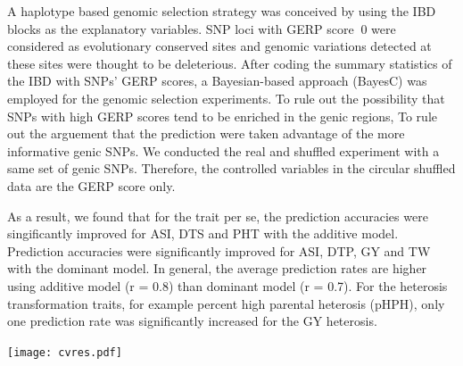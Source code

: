 \documentclass[a0,portrait]{a0poster}
\begin{document}
\begin{multicols}{2}
A haplotype based genomic selection strategy was conceived by using the IBD blocks as the explanatory variables. SNP loci with GERP score $\>$0 were considered as evolutionary conserved sites and genomic variations detected at these sites were thought to be deleterious. After coding the summary statistics of the IBD with SNPs' GERP scores, a Bayesian-based approach (BayesC) \citep{} was employed for the genomic selection experiments. To rule out the possibility that SNPs with high GERP scores tend to be enriched in the genic regions, To rule out the arguement that the prediction were taken advantage of the more informative genic SNPs. We conducted the real and shuffled experiment with a same set of genic SNPs. Therefore, the controlled variables in the circular shuffled data are the GERP score only.

As a result, we found that for the trait per se, the prediction accuracies were singificantly improved for ASI, DTS and PHT with the additive model. Prediction accuracies were significantly improved for ASI, DTP, GY and TW with the dominant model. In general, the average prediction rates are higher using additive model (r = 0.8) than dominant model (r = 0.7). For the heterosis transformation traits, for example percent high parental heterosis (pHPH), only one prediction rate was significantly increased for the GY heterosis. 

\begin{center}\vspace{1cm}
\texttt{[image: cvres.pdf]}
\end{center}\vspace{1cm}



\end{multicols}
\end{document}
